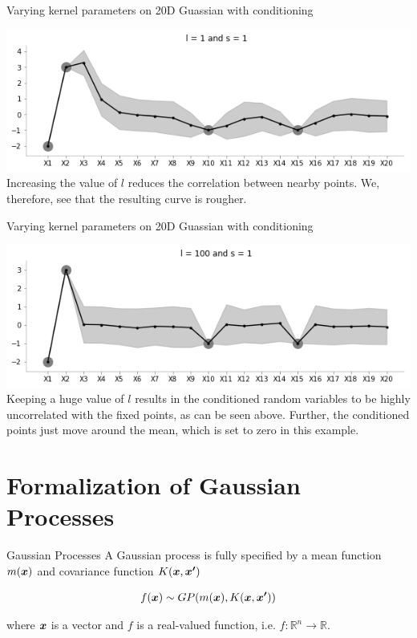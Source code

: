 \documentclass{beamer}
\begin{document}
\begin{frame}{Varying kernel parameters on 20D Guassian with conditioning}
	\begin{center}
		\includegraphics[width=\linewidth, height=\textheight -120pt ,keepaspectratio]{gp/kernel/20gp_ker3}\\
		Increasing the value of $l$ reduces the correlation between nearby points. We, therefore, see that the resulting curve is rougher.
	\end{center}
\end{frame}

\begin{frame}{Varying kernel parameters on 20D Guassian with conditioning}
	\begin{center}
		\includegraphics[width=\linewidth, height=\textheight -120pt ,keepaspectratio]{gp/kernel/20gp_ker4}\\
		Keeping a huge value of $l$ results in the conditioned random variables to be highly uncorrelated with the fixed points, as can be seen above. Further, the conditioned points just move around the mean, which is set to zero in this example.
	\end{center}
\end{frame}

\section{Formalization of Gaussian Processes}

\begin{frame}{Gaussian Processes}
		A Gaussian process is fully specified by a mean function $m(\bm{x})$ and covariance function $K(\bm{x}, \bm{x'})$
		
		$$f(\bm{x}) \sim GP (m(\bm{x}),K(\bm{x}, \bm{x'}))$$
		
		where $\bm{x}$ is a vector and $f$ is a real-valued function, i.e. $f: \mathbb{R}^n \rightarrow \mathbb{R}$.
\end{frame}
\end{document}
